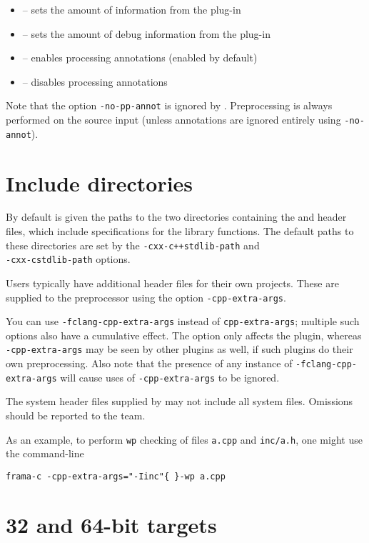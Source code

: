 \begin{itemize}
	\item {} -- sets the amount of information from the \fclang plug-in
	\item {} -- sets the amount of debug information from the \fclang plug-in
	\item {} -- enables processing \acslpp annotations (enabled by default)
	\item {} -- disables processing \acslpp annotations
\end{itemize}

Note that the \framac option \verb|-no-pp-annot| is ignored by \fclang. Preprocessing is always performed on the source input (unless annotations are ignored entirely using \verb|-no-annot|).
\section{Include directories}

By default \irg is given the paths to the two directories containing the \fcl and \fc header files, which include \acslpp specifications for the \cpp library functions. The default paths to these directories are set by the \lstinline|-cxx-c++stdlib-path| and\\
 \lstinline|-cxx-cstdlib-path| options.

Users typically have additional header files for their own projects. These are supplied to the \fcl preprocessor using the option \lstinline|-cpp-extra-args|.

You can use \lstinline|-fclang-cpp-extra-args| instead of \lstinline|cpp-extra-args|; multiple such options also have a cumulative effect. 
The \fcl option only affects the \fcl plugin, whereas 
\lstinline|-cpp-extra-args| may be seen by other plugins as well, if such plugins do their own preprocessing. Also note that the presence of any instance of \lstinline|-fclang-cpp-extra-args| will cause uses of \lstinline|-cpp-extra-args| to be ignored. 

The system header files supplied by \fcl may not include all \cpp system files. Omissions should be reported to the \fc team.

As an example, to perform \lstinline|wp| checking of files \lstinline|a.cpp| and \lstinline|inc/a.h|, one might use the command-line \\
\centerline{\lstinline|frama-c -cpp-extra-args="-Iinc"{ }-wp a.cpp|}

\section{32 and 64-bit targets}
\label{sec:bit}

